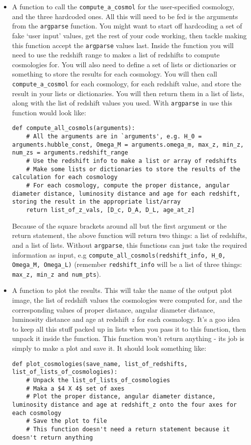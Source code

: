 \documentclass[]{article}
\begin{document}
\begin{itemize}
\item A function to call the \texttt{compute\_a\_cosmol} for the user-specified cosmology, and the three hardcoded ones. All this will need to be fed is the arguments from the \texttt{argparse} function. You might want to start off hardcoding a set of fake `user input' values, get the rest of your code working, then tackle making this function accept the \texttt{argparse} values last. Inside the function you will need to use the redshift range to makes a list of redshifts to compute cosmologies for. You will also need to define a set of lists or dictionaries or something to store the results for each cosmology. You will then call \texttt{compute\_a\_cosmol} for each cosmology, for each redshift value, and store the result in your lists or dictionaries. You will then return them in a list of lists, along with the list of redshift values you used. With \texttt{argparse} in use this function would look like:
\begin{lstlisting}
def compute_all_cosmols(arguments):
    # All the arguments are in `arguments', e.g. H_0 = arguments.hubble_const, Omega_M = arguments.omega_m, max_z, min_z, num_zs = arguments.redshift_range
    # Use the redshift info to make a list or array of redshifts
    # Make some lists or dictionaries to store the results of the calculation for each cosmology
    # For each cosmology, compute the proper distance, angular diameter distance, luminosity distance and age for each redshift, storing the result in the appropriate list/array
    return list_of_z_vals, [D_c, D_A, D_L, age_at_z] 
\end{lstlisting}
Because of the square brackets around all but the first argument or the return statement, the above function will return two things: a list of redshifts, and a list of lists. Without \texttt{argparse}, this functions can just take the required information as input, e.g \texttt{compute\_all\_cosmols(redshift\_info, H\_0, Omega\_M, Omega\_L)} (remember \texttt{redshift\_info} will be a list of three things: \texttt{max\_z, min\_z and num\_pts}). 

\item A function to plot the results. This will take the name of the output plot image, the list of redshift values the cosmologies were computed for, and the corresponding values of proper distance, angular diameter distance, luminosity distance and age at redshift $z$ for each cosmology. It's a goo idea to keep all this stuff packed up in lists when you pass it to this function, then unpack it inside the function. This function won't return anything - its job is simply to make a plot and save it. It should look something like:
\begin{lstlisting}
def plot_cosmologies(save_name, list_of_redshifts, list_of_lists_of_cosmologies):
    # Unpack the list_of_lists_of_cosmologies
    # Maka a $4 X 4$ set of axes
    # Plot the proper distance, angular diameter distance, luminosity distance and age at redshift_z onto the four axes for each cosmology
    # Save the plot to file
    # This function doesn't need a return statement because it doesn't return anything
\end{lstlisting}


\end{itemize}
\end{document}
